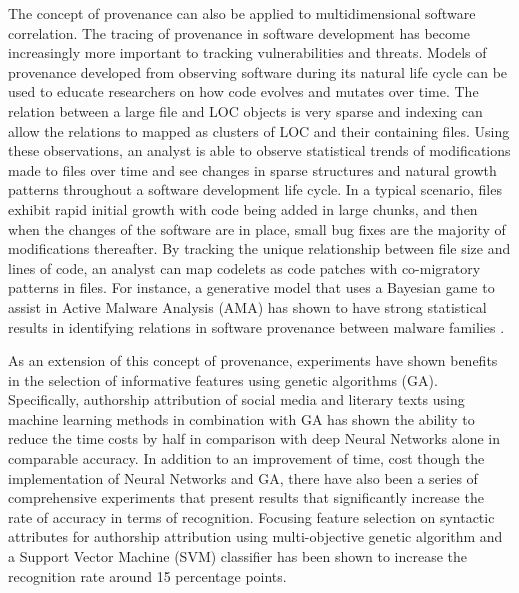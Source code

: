 \documentclass[12pt]{report}
\begin{document}
The concept of provenance can also be applied to multidimensional software correlation.  The tracing of provenance in software development has become increasingly more important to tracking vulnerabilities and threats.  Models of provenance developed from observing software during its natural life cycle can be used to educate researchers on how code evolves and mutates over time.  The relation between a large file and LOC objects is very sparse and indexing can allow the relations to mapped as clusters of LOC and their containing files.  Using these observations, an analyst is able to observe statistical trends of modifications made to files over time and see changes in sparse structures and natural growth patterns throughout a software development life cycle.  In a typical scenario, files exhibit rapid initial growth with code being added in large chunks, and then when the changes of the software are in place, small bug fixes are the majority of modifications thereafter.  By tracking the unique relationship between file size and lines of code, an analyst can map codelets as code patches with co-migratory patterns in files.  \cite{provenance2:2014}  For instance, a generative model that uses a Bayesian game to assist in Active Malware Analysis (AMA) has shown to have strong statistical results in identifying relations in software provenance between malware families \cite{sartea2020bayesian}.  

As an extension of this concept of provenance, experiments have shown benefits in the selection of informative features using genetic algorithms (GA).   Specifically, authorship attribution of social media and literary texts using machine learning methods in combination with GA has shown the ability to reduce the time costs by half in comparison with deep Neural Networks alone in comparable accuracy.  \cite{fedotova2021authorship}  In addition to an improvement of time, cost though the implementation of Neural Networks and GA, there have also been a series of comprehensive experiments that present results that significantly increase the rate of accuracy in terms of recognition.  Focusing feature selection on syntactic attributes for authorship attribution using multi-objective genetic algorithm and a Support Vector Machine (SVM) classifier has been shown to increase the recognition rate around 15 percentage points.  \cite{varela2011selecting}
\end{document}

